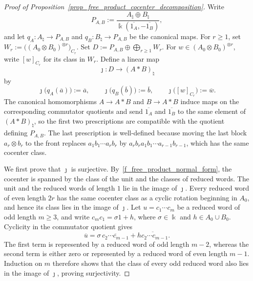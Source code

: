 \begin{proof}[Proof of Proposition~\ref{prop_free_product_cocenter_decomposition}]
    Write
    \[
        P_{A,B}:=\frac{A_{\natural}\oplus B_{\natural}}{\Bbbk(\overline{1_A},-\overline{1_B})},
    \]
    and let \(q_A\colon A_{\natural}\to P_{A,B}\) and \(q_B\colon B_{\natural}\to P_{A,B}\) be the canonical maps.
    For \(r\geq1\), set \(W_r:=\bigl((A_0\otimes B_0)^{\otimes r}\bigr)_{C_r}\).
    Set \(D:=P_{A,B}\oplus\bigoplus_{r\geq1}W_r\).
    For \(w\in(A_0\otimes B_0)^{\otimes r}\), write \([w]_{C_r}\) for its class in \(W_r\).
    Define a linear map
    \[
        \jmath\colon D\longrightarrow(A*B)_{\natural}
    \]
    by
    \[
        \jmath\bigl(q_A(\overline a)\bigr):=\overline a,
        \qquad
        \jmath\bigl(q_B(\overline b)\bigr):=\overline b,
        \qquad
        \jmath\bigl([w]_{C_r}\bigr):=\overline w.
    \]
    The canonical homomorphisms \(A\to A*B\) and \(B\to A*B\) induce maps on the corresponding commutator quotients and send \(\overline{1_A}\) and \(\overline{1_B}\) to the same element of \((A*B)_{\natural}\), so the first two prescriptions are compatible with the quotient defining \(P_{A,B}\).
    The last prescription is well-defined because moving the last block \(a_r\otimes b_r\) to the front replaces \(a_1b_1\cdots a_rb_r\) by \(a_rb_ra_1b_1\cdots a_{r-1}b_{r-1}\), which has the same cocenter class.

    We first prove that \(\jmath\) is surjective.
    By~\eqref{f_free_product_normal_form}, the cocenter is spanned by the class of the unit and the classes of reduced words.
    The unit and the reduced words of length \(1\) lie in the image of \(\jmath\).
    Every reduced word of even length \(2r\) has the same cocenter class as a cyclic rotation beginning in \(A_0\), and hence its class lies in the image of \(\jmath\).
    Let \(u=c_1\cdots c_m\) be a reduced word of odd length \(m\geq3\), and write \(c_m c_1=\sigma 1+h\), where \(\sigma\in\Bbbk\) and \(h\in A_0\cup B_0\).
    Cyclicity in the commutator quotient gives
    \begin{equation}\label{f_free_product_odd_folding}
        \overline u
        =\sigma\,\overline{c_2\cdots c_{m-1}}
        +\overline{h c_2\cdots c_{m-1}}.
    \end{equation}
    The first term is represented by a reduced word of odd length \(m-2\), whereas the second term is either zero or represented by a reduced word of even length \(m-1\).
    Induction on \(m\) therefore shows that the class of every odd reduced word also lies in the image of \(\jmath\), proving surjectivity.


\end{proof}
